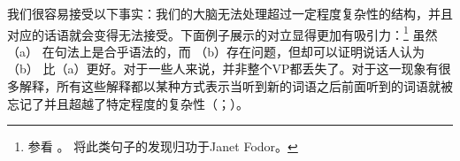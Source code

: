 我们很容易接受以下事实：我们的大脑无法处理超过一定程度复杂性的结构，并且对应的话语就会变得无法接受。下面例子展示的对立显得更加有吸引力：\footnote{%
参看 。 \citet[]{Frazier85a-u}将此类句子的发现归功于Janet Fodor。
}
\eal
{}
\zl
虽然 （a） 在句法上是合乎语法的，而 （b）存在问题，但\citet{GT99a}却可以证明说话人认为（b） 比（a）更好。对于一些人来说，并非整个VP都丢失了。对于这一现象有很多解释，所有这些解释都以某种方式表示当听到新的词语之后前面听到的词语就被忘记了并且超越了特定程度的复杂性（\citealp[]{Frazier85a-u}；\citealp{GT99a}）。

